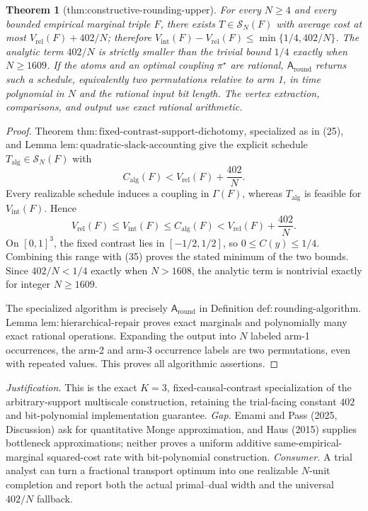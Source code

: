 \documentclass{article}
\newtheorem{theorem}{Theorem}
\begin{document}
\begin{theorem}[thm:constructive-rounding-upper]\label{thm:constructive-rounding-upper}
For every \(N\ge4\) and every bounded empirical marginal triple \(F\), there exists \(T\in\mathcal S_N(F)\) with average cost at most \(V_{\mathrm{rel}}(F)+402/N\); therefore \(V_{\mathrm{int}}(F)-V_{\mathrm{rel}}(F)\le\min\{1/4,402/N\}\).  The analytic term \(402/N\) is strictly smaller than the trivial bound \(1/4\) exactly when \(N\ge1609\).  If the atoms and an optimal coupling \(\pi^\star\) are rational, \(\mathsf A_{\mathrm{round}}\) returns such a schedule, equivalently two permutations relative to arm 1, in time polynomial in \(N\) and the rational input bit length.  The vertex extraction, comparisons, and output use exact rational arithmetic.
\end{theorem}
\begin{proof}
Theorem \(\mathrm{thm{:}fixed\mbox{-}contrast\mbox{-}support\mbox{-}dichotomy}\), specialized as in (25), and Lemma \(\mathrm{lem{:}quadratic\mbox{-}slack\mbox{-}accounting}\) give the explicit schedule \(T_{\mathrm{alg}}\in\mathcal S_N(F)\) with
\[
 C_{\mathrm{alg}}(F)<V_{\mathrm{rel}}(F)+\frac{402}{N}. \tag{34}
\]
Every realizable schedule induces a coupling in \(\Gamma(F)\), whereas \(T_{\mathrm{alg}}\) is feasible for \(V_{\mathrm{int}}(F)\).  Hence
\[
 V_{\mathrm{rel}}(F)\le V_{\mathrm{int}}(F)\le C_{\mathrm{alg}}(F)
 <V_{\mathrm{rel}}(F)+\frac{402}{N}. \tag{35}
\]
On \([0,1]^3\), the fixed contrast lies in \([-1/2,1/2]\), so \(0\le C(y)\le1/4\).  Combining this range with (35) proves the stated minimum of the two bounds.  Since \(402/N<1/4\) exactly when \(N>1608\), the analytic term is nontrivial exactly for integer \(N\ge1609\).

The specialized algorithm is precisely \(\mathsf A_{\mathrm{round}}\) in Definition \(\mathrm{def{:}rounding\mbox{-}algorithm}\).  Lemma \(\mathrm{lem{:}hierarchical\mbox{-}repair}\) proves exact marginals and polynomially many exact rational operations.  Expanding the output into \(N\) labeled arm-1 occurrences, the arm-2 and arm-3 occurrence labels are two permutations, even with repeated values.  This proves all algorithmic assertions.
\end{proof}
\par\smallskip\noindent \textit{Justification.} This is the exact \(K=3\), fixed-causal-contrast specialization of the arbitrary-support multiscale construction, retaining the trial-facing constant \(402\) and bit-polynomial implementation guarantee. \textit{Gap.} Emami and Pass (2025, Discussion) ask for quantitative Monge approximation, and Haus (2015) supplies bottleneck approximations; neither proves a uniform additive same-empirical-marginal squared-cost rate with bit-polynomial construction. \textit{Consumer.} A trial analyst can turn a fractional transport optimum into one realizable \(N\)-unit completion and report both the actual primal--dual width and the universal \(402/N\) fallback.
\end{document}
